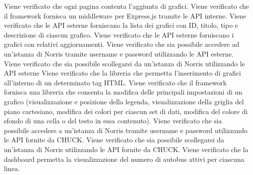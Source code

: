 Viene verificato che ogni pagina contenta l'aggiunta di grafici.
Viene verificato che il framework fornisca un middleware per Express.js tramite le API interne.
Viene verificato che le API esterne forniscano la lista dei grafici con ID, titolo, tipo e descrizione di ciascun grafico.
Viene verificato che le API esterne forniscano i grafici con relativi aggiornamenti.
Viene verificato che sia possibile accedere ad un'istanza di Norris tramite username e password utilizzando le API esterne.
Viene verificato che sia possibile scollegarsi da un'istanza di Norris utilizzando le API esterne
Viene verificato che la libreria che permetta l'inserimento di grafici all'interno di un determinato tag HTML.
Viene verificato che il framework fornisca una libreria che consenta la modifica delle principali impostazioni di un grafico (visualizzazione e posizione della legenda, visualizzazione della griglia del piano cartesiano, modifica dei colori per ciascun set di dati, modifica del colore di sfondo di una cella o del testo in essa contenuto).
Viene verificato che sia possibile accedere a un'istanza di Norris tramite username e password utilizzando le API fornite da CHUCK.
Viene verificato che sia possibile scollegarsi da un'istanza di Norris utilizzando le API fornite da CHUCK.
Viene verificato che la dashboard permetta la visualizzazione del numero di autobus attivi per ciascuna linea.
